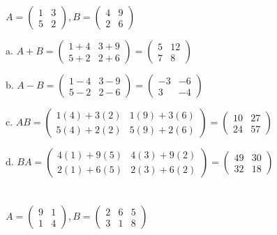 \documentclass{article}
\begin{document}
\section{}

$ A = \begin{pmatrix} 1 & 3 \\ 5 & 2 \end{pmatrix}, B = \begin{pmatrix} 4 & 9 \\ 2 & 6 \end{pmatrix}$

a. $A + B = \begin{pmatrix} 1+4 & 3+9 \\ 5+2 & 2+6 \end{pmatrix} = \begin{pmatrix} 5 & 12 \\ 7 & 8 \end{pmatrix}$

b. $A - B = \begin{pmatrix} 1-4 & 3-9 \\ 5-2 & 2-6 \end{pmatrix} = \begin{pmatrix} -3 & -6 \\ 3 & -4 \end{pmatrix}$

c. $AB = \begin{pmatrix} 1(4)+3(2)& 1(9)+3(6) \\ 5(4)+2(2) & 5(9)+2(6) \end{pmatrix} = \begin{pmatrix} 10 & 27 \\ 24 & 57 \end{pmatrix}$

d. $BA = \begin{pmatrix} 4(1)+9(5) & 4(3)+9(2) \\ 2(1)+6(5) & 2(3)+6(2) \end{pmatrix} = \begin{pmatrix} 49 & 30 \\ 32 & 18 \end{pmatrix}$

\section{}
$ A = \begin{pmatrix} 9 & 1 \\ 1 & 4 \end{pmatrix}, B = \begin{pmatrix} 2 & 6 & 5 \\ 3 & 1 & 8 \end{pmatrix}$
\end{document}
